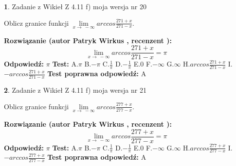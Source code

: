 \documentclass[12pt, a4paper]{article}
\theoremstyle{definition} %
\newtheorem{zad}{}
\newcommand{\zadStart}[1]{\begin{zad}#1\newline}
\newcommand{\zadStop}{\end{zad}}
\newcommand{\rozwStart}[2]{\noindent \textbf{Rozwiązanie (autor #1 , recenzent #2): }\newline}
\newcommand{\rozwStop}{\newline}
\newcommand{\odpStart}{\noindent \textbf{Odpowiedź:}\newline}
\newcommand{\odpStop}{\newline}
\newcommand{\testStart}{\noindent \textbf{Test:}\newline}
\newcommand{\testStop}{\newline}
\newcommand{\kluczStart}{\noindent \textbf{Test poprawna odpowiedź:}\newline}
\newcommand{\kluczStop}{\newline}
\begin{document}
\zadStart{Zadanie z Wikieł Z 4.11 f) moja wersja nr 20}

Oblicz granice funkcji $\lim\limits_{x\to\ -\infty}arccos\frac{271+x}{271-x}$.
\zadStop
\rozwStart{Patryk Wirkus}{}
$$\lim\limits_{x\to\ -\infty}arccos\frac{271+x}{271-x} = \pi$$
\rozwStop
\odpStart
$\pi$
\odpStop
\testStart
A.$\pi$ B.$-\pi$ C.$\frac{1}{\pi}$ D.$-\frac{1}{\pi}$ E.$0$ F.$-\infty$ G.$\infty$ H.$arccos\frac{271+x}{271-x}$ I.$-arccos\frac{271+x}{271-x}$
\testStop
\kluczStart
A
\kluczStop



\zadStart{Zadanie z Wikieł Z 4.11 f) moja wersja nr 21}

Oblicz granice funkcji $\lim\limits_{x\to\ -\infty}arccos\frac{277+x}{277-x}$.
\zadStop
\rozwStart{Patryk Wirkus}{}
$$\lim\limits_{x\to\ -\infty}arccos\frac{277+x}{277-x} = \pi$$
\rozwStop
\odpStart
$\pi$
\odpStop
\testStart
A.$\pi$ B.$-\pi$ C.$\frac{1}{\pi}$ D.$-\frac{1}{\pi}$ E.$0$ F.$-\infty$ G.$\infty$ H.$arccos\frac{277+x}{277-x}$ I.$-arccos\frac{277+x}{277-x}$
\testStop
\kluczStart
A
\kluczStop
\end{document}
